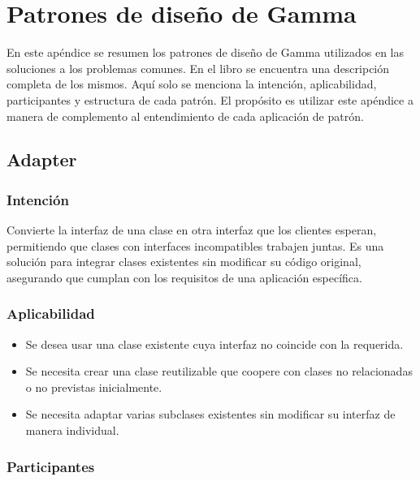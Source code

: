 

\chapter{Patrones de diseño de Gamma}

En este apéndice se resumen los patrones de diseño de Gamma \cite{Gamma:1995:DPE:186897} utilizados en las soluciones a los problemas comunes. En el libro se encuentra una descripción completa de los mismos. Aquí solo se menciona la intención, aplicabilidad, participantes y estructura de cada patrón. El propósito es utilizar este apéndice a manera de complemento al entendimiento de cada aplicación de patrón.

\section{Adapter}

\subsection*{Intención}

Convierte la interfaz de una clase en otra interfaz que los clientes esperan, permitiendo que clases con interfaces incompatibles trabajen juntas. Es una solución para integrar clases existentes sin modificar su código original, asegurando que cumplan con los requisitos de una aplicación específica.

\subsection*{Aplicabilidad}

\begin{itemize}
\item Se desea usar una clase existente cuya interfaz no coincide con la requerida.
\item Se necesita crear una clase reutilizable que coopere con clases no relacionadas o no previstas inicialmente.
\item Se necesita adaptar varias subclases existentes sin modificar su interfaz de manera individual.
\end{itemize}


\subsection*{Participantes}

